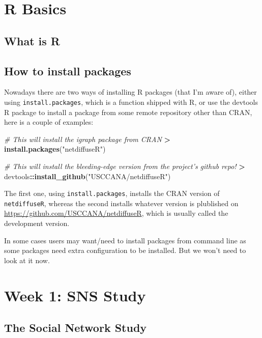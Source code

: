 \documentclass[]{book}
\newenvironment{Shaded}{\begin{snugshade}}{\end{snugshade}}
\newcommand{\KeywordTok}[1]{\textcolor[rgb]{0.13,0.29,0.53}{\textbf{#1}}}
\newcommand{\StringTok}[1]{\textcolor[rgb]{0.31,0.60,0.02}{#1}}
\newcommand{\CommentTok}[1]{\textcolor[rgb]{0.56,0.35,0.01}{\textit{#1}}}
\newcommand{\OperatorTok}[1]{\textcolor[rgb]{0.81,0.36,0.00}{\textbf{#1}}}
\newcommand{\NormalTok}[1]{#1}
\theoremstyle{definition}
\theoremstyle{definition}
\theoremstyle{definition}
\theoremstyle{remark}
\begin{document}
\chapter{R Basics}\label{r-basics}

\section{What is R}\label{what-is-r}

\section{How to install packages}\label{how-to-install-packages}

Nowadays there are two ways of installing R packages (that I'm aware
of), either using \texttt{install.packages}, which is a function shipped
with R, or use the devtools R package to install a package from some
remote repository other than CRAN, here is a couple of examples:

\begin{Shaded}
\begin{Highlighting}[]
\CommentTok{# This will install the igraph package from CRAN}
\OperatorTok{>}\StringTok{ }\KeywordTok{install.packages}\NormalTok{(}\StringTok{"netdiffuseR"}\NormalTok{)}

\CommentTok{# This will install the bleeding-edge version from the project's github repo!}
\OperatorTok{>}\StringTok{ }\NormalTok{devtools}\OperatorTok{::}\KeywordTok{install_github}\NormalTok{(}\StringTok{"USCCANA/netdiffuseR"}\NormalTok{)}
\end{Highlighting}
\end{Shaded}

The first one, using \texttt{install.packages}, installs the CRAN
version of \texttt{netdiffuseR}, whereas the second installs whatever
version is plublished on \url{https://github.com/USCCANA/netdiffuseR},
which is usually called the development version.

In some cases users may want/need to install packages from command line
as some packages need extra configuration to be installed. But we won't
need to look at it now.

\chapter{Week 1: SNS Study}\label{week-1-sns-study}

\section{The Social Network Study}\label{the-social-network-study}
\end{document}
